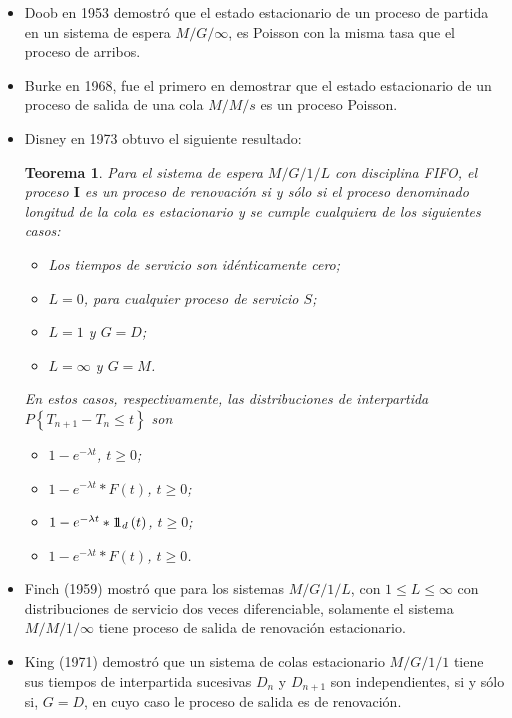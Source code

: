 \documentclass{article}
\newtheorem{Teo}{Teorema}%
\newcommand{\indora}{\mbox{$1$\hspace{-0.8ex}$1$}}
\numberwithin{equation}{section}
\begin{document}
\begin{itemize}
\item Doob en 1953 demostr\'o que el estado estacionario de un proceso de partida en un sistema de espera $M/G/\infty$, es Poisson con la misma tasa que el proceso de arribos.

\item Burke en 1968, fue el primero en demostrar que el estado estacionario de un proceso de salida de una cola $M/M/s$ es un proceso Poisson.

\item Disney en 1973 obtuvo el siguiente resultado:

\begin{Teo}
Para el sistema de espera $M/G/1/L$ con disciplina FIFO, el proceso $\textbf{I}$ es un proceso de renovaci\'on si y s\'olo si el proceso denominado longitud de la cola es estacionario y se cumple cualquiera de los siguientes casos:

\begin{itemize}
\item[a)] Los tiempos de servicio son id\'enticamente cero;
\item[b)] $L=0$, para cualquier proceso de servicio $S$;
\item[c)] $L=1$ y $G=D$;
\item[d)] $L=\infty$ y $G=M$.
\end{itemize}
En estos casos, respectivamente, las distribuciones de interpartida $P\left\{T_{n+1}-T_{n}\leq t\right\}$ son


\begin{itemize}
\item[a)] $1-e^{-\lambda t}$, $t\geq0$;
\item[b)] $1-e^{-\lambda t}*F\left(t\right)$, $t\geq0$;
\item[c)] $1-e^{-\lambda t}*\indora_{d}\left(t\right)$, $t\geq0$;
\item[d)] $1-e^{-\lambda t}*F\left(t\right)$, $t\geq0$.
\end{itemize}
\end{Teo}


\item Finch (1959) mostr\'o que para los sistemas $M/G/1/L$, con $1\leq L\leq \infty$ con distribuciones de servicio dos veces diferenciable, solamente el sistema $M/M/1/\infty$ tiene proceso de salida de renovaci\'on estacionario.

\item King (1971) demostr\'o que un sistema de colas estacionario $M/G/1/1$ tiene sus tiempos de interpartida sucesivas $D_{n}$ y $D_{n+1}$ son independientes, si y s\'olo si, $G=D$, en cuyo caso le proceso de salida es de renovaci\'on.


\end{itemize}
\end{document}
